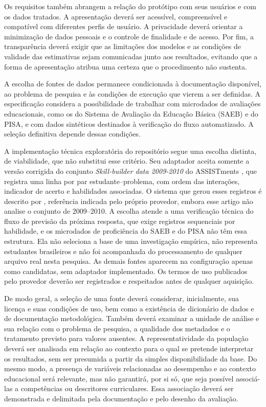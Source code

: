 Os requisitos também abrangem a relação do protótipo com seus usuários e com os dados tratados. A apresentação deverá ser acessível, compreensível e compatível com diferentes perfis de usuário. A privacidade deverá orientar a minimização de dados pessoais e o controle de finalidade e de acesso. Por fim, a transparência deverá exigir que as limitações dos modelos e as condições de validade das estimativas sejam comunicadas junto aos resultados, evitando que a forma de apresentação atribua uma certeza que o procedimento não sustenta.

A escolha de fontes de dados permanece condicionada à documentação disponível, ao problema de pesquisa e às condições de execução que vierem a ser definidas. A especificação considera a possibilidade de trabalhar com microdados de avaliações educacionais, como os do Sistema de Avaliação da Educação Básica (SAEB) e do PISA, e com dados sintéticos destinados à verificação do fluxo automatizado. A seleção definitiva depende dessas condições.

A implementação técnica exploratória do repositório segue uma escolha distinta, de viabilidade, que não substitui esse critério. Seu adaptador aceita somente a versão corrigida do conjunto \textit{Skill-builder data 2009-2010} do ASSISTments \cite{ASSISTmentsSkillBuilder}, que registra uma linha por par estudante--problema, com ordem das interações, indicador de acerto e habilidades associadas. O sistema que gerou esses registros é descrito por , referência indicada pelo próprio provedor, embora esse artigo não analise o conjunto de 2009--2010. A escolha atende a uma verificação técnica do fluxo de previsão da próxima resposta, que exige registros sequenciais por habilidade, e os microdados de proficiência do SAEB e do PISA não têm essa estrutura. Ela não seleciona a base de uma investigação empírica, não representa estudantes brasileiros e não foi acompanhada do processamento de qualquer arquivo real nesta pesquisa. As demais fontes aparecem na configuração apenas como candidatas, sem adaptador implementado. Os termos de uso publicados pelo provedor deverão ser registrados e respeitados antes de qualquer aquisição.

De modo geral, a seleção de uma fonte deverá considerar, inicialmente, sua licença e suas condições de uso, bem como a existência de dicionário de dados e de documentação metodológica. Também deverá examinar a unidade de análise e sua relação com o problema de pesquisa, a qualidade dos metadados e o tratamento previsto para valores ausentes. A representatividade da população deverá ser analisada em relação ao contexto para o qual se pretende interpretar os resultados, sem ser presumida a partir da simples disponibilidade da base. Do mesmo modo, a presença de variáveis relacionadas ao desempenho e ao contexto educacional será relevante, mas não garantirá, por si só, que seja possível associá-las a competências ou descritores curriculares. Essa associação deverá ser demonstrada e delimitada pela documentação e pelo desenho da avaliação.

